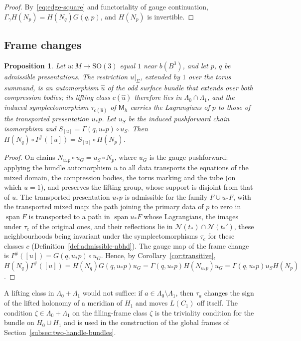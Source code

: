 \documentclass[11pt]{amsart}
\newtheorem{proposition}[theorem]{Proposition}
\theoremstyle{definition}
\theoremstyle{remark}
\theoremstyle{plain}
\numberwithin{equation}{section}
\newcommand{\SO}{\mathrm{SO}}
\newcommand{\Ish}{I^{\#}}
\newcommand{\Msf}{\mathsf{M}}
\begin{document}
\begin{proof}
By~\eqref{eq:edge-square} and functoriality of gauge continuation,
$\Gamma_\gamma H(N_p)=H(N_q)G(q,p)$, and $H(N_p)$ is invertible.
\end{proof}

\subsection{Frame changes}

\begin{proposition}\label{prop:frame-square}
Let $u\colon M\to\SO(3)$ equal $1$ near $b(B^3)$, and let $p$, $q$ be admissible
presentations. The restriction $u|_\Sigma$, extended by $1$ over the torus
summand, is an automorphism $\hat u$ of the odd surface bundle that extends
over both compression bodies; its lifting class $c(\hat u)$ therefore lies in
$\Lambda_0\cap \Lambda_1$, and the induced symplectomorphism $\tau_{c(\hat u)}$ of $\Msf_h$
carries the Lagrangians of $p$ to those of the transported presentation
$u_*p$. Let $u_S$ be the induced pushforward chain isomorphism and
$S_{[u]}=\Gamma(q,u_*p)\circ u_S$. Then $H(N_q)\circ\Ish([u])=S_{[u]}\circ H(N_p)$.
\end{proposition}

\begin{proof}
On chains $N_{u_*p}\circ u_G=u_S\circ N_p$, where $u_G$ is the gauge
pushforward: applying the bundle automorphism $u$ to all data transports
the equations of the mixed domain, the compression bodies, the torus
marking and the tube (on which $u=1$), and preserves the lifting group,
whose support is disjoint from that of $u$. The transported presentation
$u_*p$ is admissible for the family $F\cup u_*F$, with the transported mixed map: the path
joining the primary data of $p$ to zero in $\operatorname{span}F$ is transported to a path in
$\operatorname{span}u_*F$ whose Lagrangians, the images under $\tau_c$ of the original ones, and
their reflections lie in $\mathcal N(t_*)\cap\mathcal N(t_*')$, these neighbourhoods being
invariant under the symplectomorphisms $\tau_c$ for these classes $c$
(Definition~\ref{def:admissible-nbhd}). The gauge map of the
frame change is $\Ish([u])=G(q,u_*p)\circ u_G$. Hence, by
Corollary~\ref{cor:transitive},
$H(N_q)\Ish([u])=H(N_q)G(q,u_*p)u_G=\Gamma(q,u_*p)H(N_{u_*p})u_G=\Gamma(q,u_*p)u_SH(N_p)$.
\end{proof}

A lifting class in $\Lambda_0+\Lambda_1$ would not suffice: if $a\in \Lambda_0\setminus \Lambda_1$, then
$\tau_a$ changes the sign of the lifted holonomy of a meridian of $H_1$ and
moves $L(C_1)$ off itself. The condition $\zeta\in \Lambda_0+\Lambda_1$ on the filling-frame class $\zeta$ is the triviality
condition for the bundle on $H_0\cup H_1$ and is used in the construction of
the global frames of Section~\ref{subsec:two-handle-bundles}.
\end{document}
